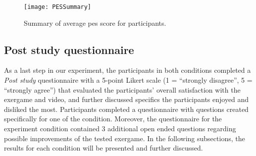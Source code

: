 \begin{figure}[h]
    \centering
    \texttt{[image: PESSummary]}
    \caption{Summary of average \gls{pes} score for participants.}
    \label{fig:pes}
\end{figure}\pagebreak



\subsection{Post study questionnaire}
As a last step in our experiment, the participants in both conditions completed  a \textit{Post study} questionnaire  with a 5-point Likert scale (1 = ``strongly disagree'', 5 = ``strongly agree'') that evaluated the participants' overall satisfaction with the exergame and video, and further discussed specifics the participants enjoyed and disliked the most. Participants completed a questionnaire with questions created specifically for one of the condition. Moreover, the questionnaire for the experiment condition contained 3 additional open ended questions regarding possible improvements of the tested exergame. In the following subsections, the results for each condition will be presented and further discussed.
